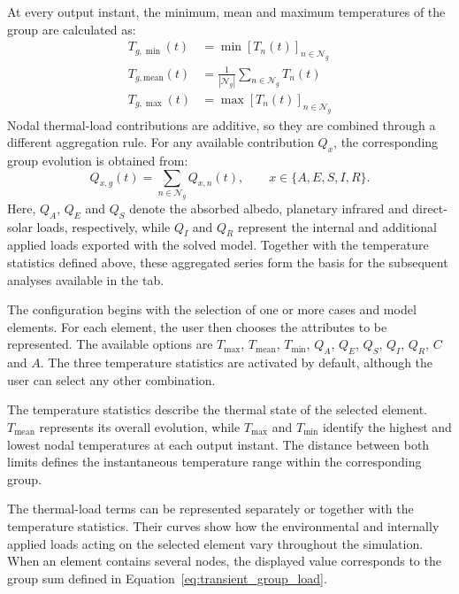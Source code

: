 At every output instant, the minimum, mean and maximum temperatures of the
group are calculated as:
\begin{align}
    T_{g,\min}(t)
    &=
    \min\!\left[ T_n(t) \right]_{n\in\mathcal{N}_g}
    \label{eq:transient_group_tmin}
    \\
    T_{g,\mathrm{mean}}(t)
    &=
    \frac{1}{|\mathcal{N}_g|}
    \sum_{n\in\mathcal{N}_g} T_n(t)
    \label{eq:transient_group_tmean}
    \\
    T_{g,\max}(t)
    &=
    \max\!\left[ T_n(t) \right]_{n\in\mathcal{N}_g}
    \label{eq:transient_group_tmax}
\end{align}
Nodal thermal-load contributions are additive, so they are combined through
a different aggregation rule. For any available contribution \(Q_x\), the
corresponding group evolution is obtained from:
\begin{equation}
    Q_{x,g}(t)
    =
    \sum_{n\in\mathcal{N}_g} Q_{x,n}(t),
    \qquad
    x\in\{A,E,S,I,R\}.
    \label{eq:transient_group_load}
\end{equation}
Here, \(Q_A\), \(Q_E\) and \(Q_S\) denote the absorbed albedo, planetary
infrared and direct-solar loads, respectively, while \(Q_I\) and \(Q_R\)
represent the internal and additional applied loads exported with the solved
model. Together with the temperature statistics defined above, these aggregated
series form the basis for the subsequent analyses available in
the tab.

The configuration begins with the selection of one or more cases and model
elements. For each element, the user then chooses the attributes to be
represented. The available options are \(T_{\max}\), \(T_{\mathrm{mean}}\),
\(T_{\min}\), \(Q_A\), \(Q_E\), \(Q_S\), \(Q_I\), \(Q_R\), \(C\) and
\(A\). The three temperature statistics are activated by default, although 
the user can select any other combination.

The temperature statistics describe the thermal state of the selected
element. \(T_{\mathrm{mean}}\) represents its overall evolution, while
\(T_{\max}\) and \(T_{\min}\) identify the highest and lowest nodal
temperatures at each output instant. The distance between both limits defines
the instantaneous temperature range within the corresponding group.

The thermal-load terms can be represented separately or together with the
temperature statistics. Their curves show how the environmental and
internally applied loads acting on the selected element vary throughout the
simulation. When an element contains several nodes, the displayed value
corresponds to the group sum defined in
Equation~\eqref{eq:transient_group_load}.

